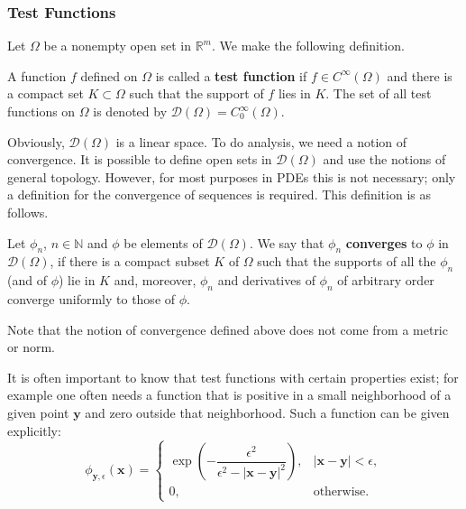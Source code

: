 \subsubsection{Test Functions}\label{subsec:test-functions}

Let $\Omega$ be a nonempty open set in $\mathbb{R}^m$. We make the following definition.

\begin{Definition}
\label{def:test-function}
A function $f$ defined on $\Omega$ is called a \textbf{test function} if $f\in C^\infty(\Omega)$ and there is a compact set $K\subset\Omega$ such that the support of $f$ lies in $K$. The set of all test functions on $\Omega$ is denoted by $\mathcal{D}(\Omega)=C_0^\infty(\Omega)$.
\end{Definition}

Obviously, $\mathcal{D}(\Omega)$ is a linear space. To do analysis, we need a notion of convergence. It is possible to define open sets in $\mathcal{D}(\Omega)$ and use the notions of general topology. However, for most purposes in PDEs this is not necessary; only a definition for the convergence of sequences is required. This definition is as follows.

\begin{Definition}
\label{def:test-function-convergence}
Let $\phi_n$, $n\in\mathbb{N}$ and $\phi$ be elements of $\mathcal{D}(\Omega)$. We say that $\phi_n$ \textbf{converges} to $\phi$ in $\mathcal{D}(\Omega)$, if there is a compact subset $K$ of $\Omega$ such that the supports of all the $\phi_n$ (and of $\phi$) lie in $K$ and, moreover, $\phi_n$ and derivatives of $\phi_n$ of arbitrary order converge uniformly to those of $\phi$.
\end{Definition}

\begin{Remark}
\label{rem:test-function-convergence-nonmetric}
Note that the notion of convergence defined above does not come from a metric or norm.
\end{Remark}

It is often important to know that test functions with certain properties exist; for example one often needs a function that is positive in a small neighborhood of a given point $\bm{y}$ and zero outside that neighborhood. Such a function can be given explicitly:
\begin{equation}\label{eq:smooth-compact-bump-function}
\phi_{\bm{y},\epsilon}(\bm{x})=\begin{cases}\exp\left(-\dfrac{\epsilon^2}{\epsilon^2-|\bm{x}-\bm{y}|^2}\right),&|\bm{x}-\bm{y}|<\epsilon,\\0,&\text{otherwise.}\end{cases}
\end{equation}


